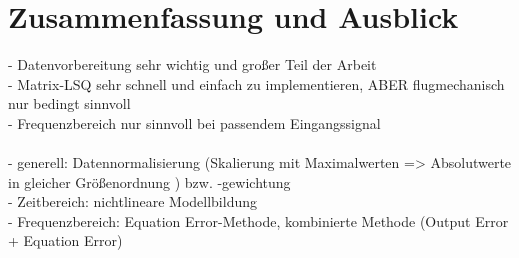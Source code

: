 \chapter{Zusammenfassung und Ausblick}
- Datenvorbereitung sehr wichtig und großer Teil der Arbeit\\
- Matrix-LSQ sehr schnell und einfach zu implementieren, ABER flugmechanisch nur bedingt sinnvoll\\
- Frequenzbereich nur sinnvoll bei passendem Eingangssignal\\
\\
- generell: Datennormalisierung (Skalierung mit Maximalwerten => Absolutwerte in gleicher Größenordnung
) bzw. -gewichtung\\
- Zeitbereich: nichtlineare Modellbildung\\
- Frequenzbereich: Equation Error-Methode, kombinierte Methode (Output Error + Equation Error)
